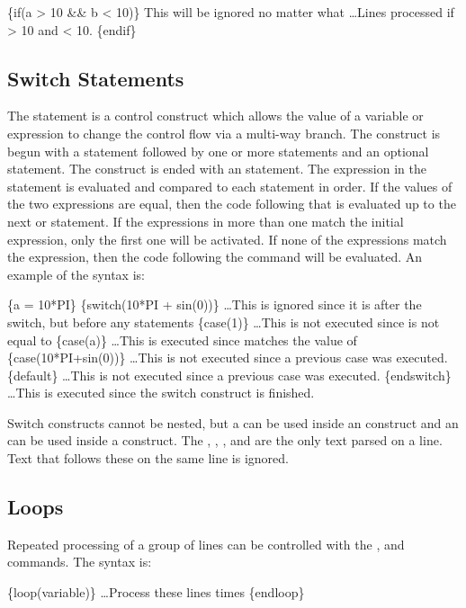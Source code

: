 \begin{apinp}
\{if(a > 10 && b < 10)\} This will be ignored no matter what
\ldots Lines processed if  > 10 and  < 10.
\{endif\}
\end{apinp}

\subsection{Switch Statements}
The  statement is a control construct which allows the value of a variable or expression to change the control flow via a multi-way branch.
The construct is begun with a  statement followed by one or more  statements and an optional  statement. The construct is ended with an  statement.  The expression in the  statement is evaluated and compared to each  statement in order.  If the values of the two expressions are equal, then the code following that  is evaluated up to the next  or  statement. If the expressions in more than one  match the initial  expression, only the first one will be activated.  If none of the  expressions match the  expression, then the code following the  command will be evaluated. An example of the syntax is:

\begin{apinp}
\{a = 10*PI\}
\{switch(10*PI + sin(0))\}
\ldots This is ignored since it is after the switch, but before any  statements
\{case(1)\}
\ldots This is not executed since  is not equal to 
\{case(a)\}
\ldots This is executed since  matches the value of 
\{case(10*PI+sin(0))\}
\ldots This is not executed since a previous case was executed.
\{default\}
\ldots This is not executed since a previous case was executed.
\{endswitch\}
\ldots This is executed since the switch construct
 is finished.
\end{apinp}

Switch constructs cannot be nested, but a  can be used inside an  construct and an  can be used inside a  construct.
The , , , and  are the only text parsed on a line. Text that follows these on the same line is
ignored.

\subsection{Loops} Repeated processing of a group of lines can be controlled
with the , and  commands. The syntax is:
\begin{apinp}
\{loop(variable)\}
\ldots Process these lines  times
\{endloop\}
\end{apinp}

